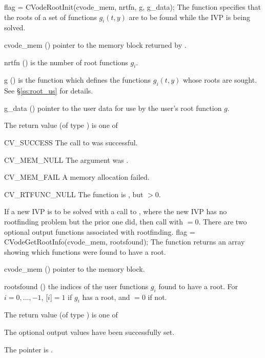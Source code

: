 {
  flag = CVodeRootInit(cvode\_mem, nrtfn, g, g\_data);
}
{
  The function  specifies that the roots of a set of
  functions $g_i(t,y)$ are to be found while the IVP is being solved.
}
{
  \begin{args}
  \item[cvode\_mem] ()
    pointer to the {\cvode} memory block returned by .
  \item[nrtfn] ()
    is the number of root functions $g_i$.
  \item[g] ()
    is the {\C} function which defines the  functions $g_i(t,y)$
    whose roots are sought. See \S\ref{ss:root_us} for details.
  \item[g\_data] ()
    pointer to the user data for use by the user's root function $g$.
 \end{args}
}
{
  The return value  (of type ) is one of
  \begin{args}
  \item[CV\_SUCCESS]
    The call to  was successful.
  \item[CV\_MEM\_NULL]
    The  argument was .
  \item[CV\_MEM\_FAIL]
    A memory allocation failed.
  \item[CV\_RTFUNC\_NULL]
    The function  is , but $>0$.
  \end{args}
}
{
  If a new IVP is to be solved with a call to , where the new
  IVP has no rootfinding problem but the prior one did, then call
   with $=0$.
}
There are two optional output functions associated with rootfinding.
{
  flag = CVodeGetRootInfo(cvode\_mem, rootsfound);
}
{
  The function  returns an array showing which 
  functions were found to have a root.
}
{
  \begin{args}
  \item[cvode\_mem] ()
    pointer to the {\cvode} memory block.
  \item[rootsfound] ()
    the indices of the user functions $g_i$ found to have a root.  For
    $i=0,\ldots,$$-1$, [$i$]$=1$ if $g_i$
    has a root, and $=0$ if not.
  \end{args}
}
{
  The return value  (of type ) is one of
  \begin{args}
  \item[\Id{CV\_SUCCESS}] 
    The optional output values have been successfully set.
  \item[\Id{CV\_MEM\_NULL}]
    The  pointer is .
  \end{args}
}
